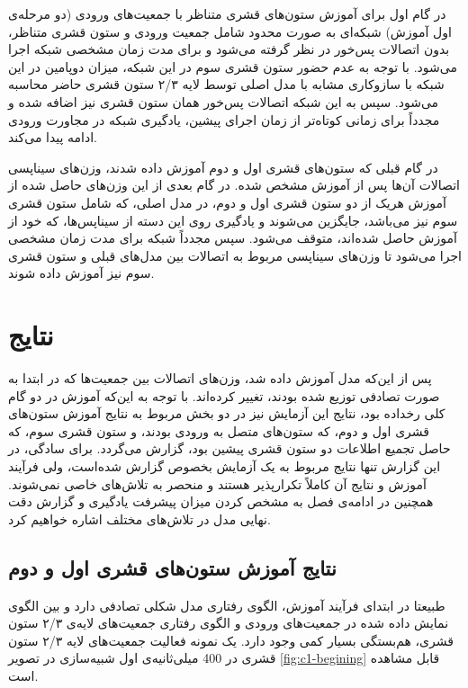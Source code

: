 \documentclass[12pt]{report}
\begin{document}
	در گام اول برای آموزش ستون‌های قشری متناظر با جمعیت‌های ورودی (دو مرحله‌ی اول آموزش) شبکه‌ای به صورت محدود شامل جمعیت ورودی و ستون قشری متناظر، بدون اتصالات پس‌خور در نظر گرفته می‌شود و برای مدت زمان مشخصی شبکه اجرا می‌شود. با توجه به عدم حضور ستون قشری سوم در این شبکه، میزان دوپامین در این شبکه با سازوکاری مشابه با مدل اصلی توسط لایه ۲/۳ ستون قشری حاضر محاسبه می‌شود. سپس به این شبکه اتصالات پس‌خور همان ستون قشری نیز اضافه شده و مجدداً برای زمانی کوتاه‌تر از زمان اجرای پیشین، یادگیری شبکه در مجاورت ورودی ادامه پیدا می‌کند.
	
	در گام قبلی که ستون‌های قشری اول و دوم آموزش داده شدند، وزن‌های سیناپسی اتصالات آن‌ها پس از آموزش مشخص شده. در گام بعدی از این وزن‌های حاصل شده از آموزش هر‌یک از دو ستون قشری اول و دوم، در مدل اصلی، که شامل ستون قشری سوم نیز می‌باشد، جایگزین می‌شوند و یادگیری روی این دسته از سیناپس‌ها، که خود از آموزش حاصل شده‌اند، متوقف می‌شود. سپس مجدداً شبکه برای مدت زمان مشخصی اجرا می‌شود تا وزن‌های سیناپسی مربوط به اتصالات بین مدل‌های قبلی و ستون قشری سوم نیز آموزش داده شوند.
	

	\section{نتایج}
	پس از این‌که مدل آموزش داده‌ شد، وزن‌های اتصالات بین جمعیت‌ها که در ابتدا به صورت تصادفی توزیع شده بودند، تغییر کرده‌اند. با توجه به این‌که آموزش در دو گام کلی رخداده بود، نتایج این آزمایش نیز در دو بخش مربوط به نتایج آموزش ستون‌های قشری اول و دوم، که ستون‌های متصل به ورودی بودند، و ستون قشری سوم، که حاصل تجمیع اطلاعات دو ستون قشری پیشین بود، گزارش می‌گردد.
	برای سادگی، در این گزارش تنها نتایج مربوط به یک آزمایش بخصوص گزارش شده‌است، ولی فرآیند آموزش و نتایج آن کاملاً تکرار‌پذیر هستند و منحصر به تلاش‌های خاصی نمی‌شوند.
	همچنین در ادامه‌ی فصل به مشخص کردن میزان پیشرفت یادگیری و  گزارش دقت نهایی مدل در تلاش‌ها‌ی مختلف اشاره خواهیم کرد.
	
	\subsection{نتایج آموزش ستون‌های قشری اول و دوم}
	طبیعتا در ابتدای فرآیند آموزش، الگوی رفتاری مدل شکلی تصادفی دارد و بین الگوی نمایش داده شده در جمعیت‌های ورودی و الگوی رفتاری جمعیت‌های لایه‌ی ۲/۳ ستون قشری، هم‌بستگی بسیار کمی وجود دارد. یک نمونه فعالیت جمعیت‌های لایه‌ ۲/۳ ستون قشری در 400 میلی‌ثانیه‌ی اول شبیه‌سازی در تصویر ‌\ref{fig:c1-begining} قابل مشاهده است.
	
\end{document}
